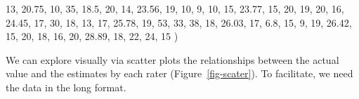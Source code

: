 \documentclass[
  letterpaper,
]{book}
\newenvironment{Shaded}{\begin{snugshade}}{\end{snugshade}}
\newcommand{\DecValTok}[1]{\textcolor[rgb]{0.68,0.00,0.00}{#1}}
\newcommand{\FloatTok}[1]{\textcolor[rgb]{0.68,0.00,0.00}{#1}}
\newcommand{\NormalTok}[1]{\textcolor[rgb]{0.00,0.23,0.31}{#1}}
\begin{document}
\begin{Shaded}
\begin{Highlighting}[]
\DecValTok{13}\NormalTok{,  }\FloatTok{20.75}\NormalTok{,  }\DecValTok{10}\NormalTok{,  }\DecValTok{35}\NormalTok{, }\FloatTok{18.5}\NormalTok{,  }\DecValTok{20}\NormalTok{,}
\DecValTok{14}\NormalTok{,  }\FloatTok{23.56}\NormalTok{,  }\DecValTok{19}\NormalTok{,  }\DecValTok{10}\NormalTok{,    }\DecValTok{9}\NormalTok{,  }\DecValTok{10}\NormalTok{,}
\DecValTok{15}\NormalTok{,  }\FloatTok{23.77}\NormalTok{,  }\DecValTok{15}\NormalTok{,  }\DecValTok{20}\NormalTok{,   }\DecValTok{19}\NormalTok{,  }\DecValTok{20}\NormalTok{,}
\DecValTok{16}\NormalTok{,  }\FloatTok{24.45}\NormalTok{,  }\DecValTok{17}\NormalTok{,  }\DecValTok{30}\NormalTok{,   }\DecValTok{18}\NormalTok{,  }\DecValTok{13}\NormalTok{,}
\DecValTok{17}\NormalTok{,  }\FloatTok{25.78}\NormalTok{,  }\DecValTok{19}\NormalTok{,  }\DecValTok{53}\NormalTok{,   }\DecValTok{33}\NormalTok{,  }\DecValTok{38}\NormalTok{,}
\DecValTok{18}\NormalTok{,  }\FloatTok{26.03}\NormalTok{,  }\DecValTok{17}\NormalTok{, }\FloatTok{6.8}\NormalTok{,   }\DecValTok{15}\NormalTok{,   }\DecValTok{9}\NormalTok{,}
\DecValTok{19}\NormalTok{,  }\FloatTok{26.42}\NormalTok{,  }\DecValTok{15}\NormalTok{,  }\DecValTok{20}\NormalTok{,   }\DecValTok{18}\NormalTok{,  }\DecValTok{16}\NormalTok{,}
\DecValTok{20}\NormalTok{,  }\FloatTok{28.89}\NormalTok{,  }\DecValTok{18}\NormalTok{,  }\DecValTok{22}\NormalTok{,   }\DecValTok{24}\NormalTok{,  }\DecValTok{15}
\NormalTok{         )}
\end{Highlighting}
\end{Shaded}

We can explore visually via scatter plots the relationships between the
actual value and the estimates by each rater (Figure~\ref{fig-scater}).
To facilitate, we need the data in the long format.
\end{document}
